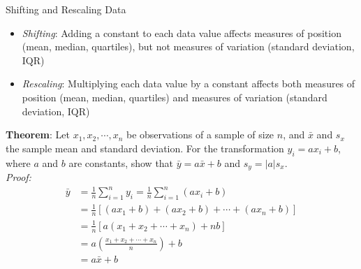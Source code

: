 \documentclass{beamer}
\begin{document}
\begin{frame}{Shifting and Rescaling Data}
\begin{itemize}
\item \emph{Shifting}: Adding a constant to each data value affects measures of position (mean, median, quartiles), but not measures of variation (standard deviation, IQR)
\vspace{10pt}
\item \emph{Rescaling}: Multiplying each data value by a constant affects both measures of position (mean, median, quartiles) and measures of variation (standard deviation, IQR)
\end{itemize}
\end{frame}

% 


\begin{frame}
\textbf{Theorem}: Let $x_1, x_2, \cdots, x_n$ be observations of a sample of size $n$, and $\bar{x}$ and $s_x$ the sample mean and standard deviation.  For the transformation $y_i = a x_i + b$, where $a$ and $b$ are constants, show that $\bar{y} = a \bar{x} + b$ and $s_y = |a| s_x$.\\
\medskip
{\color{blue}
\emph{Proof:}
\begin{align*}
\bar{y} &= \frac{1}{n} \sum_{i=1}^n y_i
= \frac{1}{n} \sum_{i=1}^n (a x_i + b)\\
&= \frac{1}{n} [(ax_1+b) + (ax_2 + b) + \cdots + (ax_n + b)]\\
&= \frac{1}{n} [a(x_1 + x_2 + \cdots + x_n) + nb]\\
&= a \left( \frac{x_1 + x_2 + \cdots + x_n}{n} \right) + b\\
& = a \bar{x} + b
\end{align*}
}
\end{frame}
\end{document}

